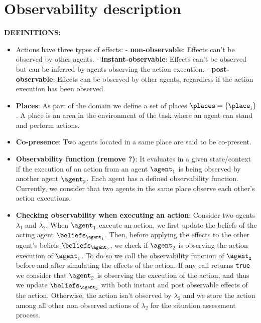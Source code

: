 \section{Observability description}

\textbf{DEFINITIONS:}
\begin{itemize}

    \item Actions have three types of effects: 
    \subitem - \textbf{non-observable}: Effects can't be observed by other agents.
    \subitem - \textbf{instant-observable}: Effects can't be observed but can be inferred by agents observing the action execution.
    \subitem - \textbf{post-observable}: Effects can be observed by other agents, regardless if the action execution has been observed.

    \item \textbf{Places}: As part of the domain we define a set of places $\places=\{ \place_i \}$. A place is an area in the environment of the task where an agent can stand and perform actions.
    
    \item \textbf{Co-presence}: Two agents located in a same place are said to be co-present. 

    \item \textbf{Observability function (remove ?)}: 
    It evaluates in a given state/context if the execution of an action from an agent $\agent_1$ is being observed by another agent $\agent_2$.
    Each agent has a defined observability function.
    Currently, we consider that two agents in the same place observe each other's action executions.
    
    \item \textbf{Checking observability when executing an action}: Consider two agents $\lambda_1$ and $\lambda_2$. When $\agent_1$ execute an action, we first update the beliefs of the acting agent $\beliefs_{\agent_1}$. Then, before applying the effects to the other agent's beliefs $\beliefs_{\agent_2}$, we check if $\agent_2$ is observing the action execution of $\agent_1$. 
    To do so we call the observability function of $\agent_2$ before and after simulating the effects of the action. If any call returns \texttt{true} we consider that $\agent_2$ is observing the execution of the action, and thus we update $\beliefs_{\agent_2}$ with both instant and post observable effects of the action. Otherwise, the action isn't observed by $\lambda_2$ and we store the action among all other non observed actions of $\lambda_2$ for the situation assessment process.
    

\end{itemize}

